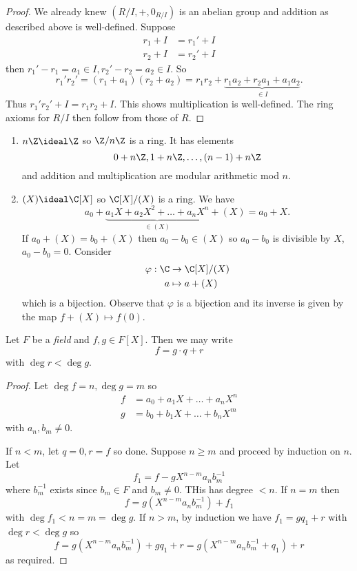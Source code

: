 \documentclass[a4paper]{article}
\theoremstyle{definition}
\begin{document}
\begin{proof}
  We already knew \((R/I, +, 0_{R/I})\) is an abelian group and addition as described above is well-defined. Suppose
  \begin{align*}
    r_1 + I &= r_1' + I \\
    r_2 + I &= r_2' + I
  \end{align*}
  then \(r_1' - r_1 = a_1 \in I, r_2' - r_2 = a_2 \in I\). So
  \[
    r_1'r_2' = (r_1 + a_1)(r_2 + a_2) = r_1r_2 + \underbrace{r_1a_2 + r_2a_1 + a_1a_2}_{\in I}.
  \]
  Thus \(r_1'r_2' + I = r_1r_2 + I\). This shows multiplication is well-defined. The ring axioms for \(R/I\) then follow from those of \(R\).
\end{proof}

\begin{eg}\leavevmode
  \begin{enumerate}
  \item \(n\Z \ideal \Z\) so \(\Z/n\Z\) is a ring. It has elements
    \[
      0 + n\Z, 1 + n\Z, \dots, (n - 1) + n\Z
    \]
    and addition and multiplication are modular arithmetic mod \(n\).
  \item \((X) \ideal \C[X]\) so \(\C[X]/(X)\) is a ring. We have
    \[
      a_0 + \underbrace{a_1X + a_2X^2 + \dots + a_nX^n}_{\in (X)} + (X) = a_0 + X.
    \]
    If \(a_0 + (X) = b_0 + (X)\) then \(a_0 - b_0 \in (X)\) so \(a_0 - b_0\) is divisible by \(X\), \(a_0 - b_0 = 0\). Consider
    \begin{align*}
      \varphi: \C &\to \C[X]/(X) \\
      a &\mapsto a + (X)
    \end{align*}
    which is a bijection. Observe that \(\varphi\) is a bijection and its inverse is given by the map \(f + (X) \mapsto f(0)\).
  \end{enumerate}
\end{eg}

\begin{proposition}
  \label{prop:polynomial euclidean}
  Let \(F\) be a \emph{field} and \(f, g \in F[X]\). Then we may write
  \[
    f = g \cdot q + r
  \]
  with \(\deg r < \deg g\).
\end{proposition}

\begin{proof}
  Let \(\deg f = n, \deg g = m\) so
  \begin{align*}
    f &= a_0 + a_1X + \dots + a_nX^n \\
    g &= b_0 + b_1X + \dots + b_nX^m
  \end{align*}
  with \(a_n, b_m \neq 0\).

  If \(n < m\), let \(q = 0, r = f\) so done. Suppose \(n \geq m\) and proceed by induction on \(n\). Let
  \[
    f_1 = f - gX^{n - m} a_nb_m^{-1}
  \]
  where \(b_m^{-1}\) exists since \(b_m \in F\) and \(b_m \neq 0\). THis has degree \(< n\). If \(n = m\) then
  \[
    f = g(X^{n - m}a_nb_m^{-1}) + f_1
  \]
  with \(\deg f_1 < n = m = \deg g\). If \(n > m\), by induction we have \(f_1 = gq_1 + r\) with \(\deg r < \deg g\) so
  \[
    f = g(X^{n - m}a_nb_m^{-1}) + gq_1 + r = g(X^{n - m}a_nb_m^{-1} + q_1) + r
  \]
  as required.
\end{proof}
\end{document}
